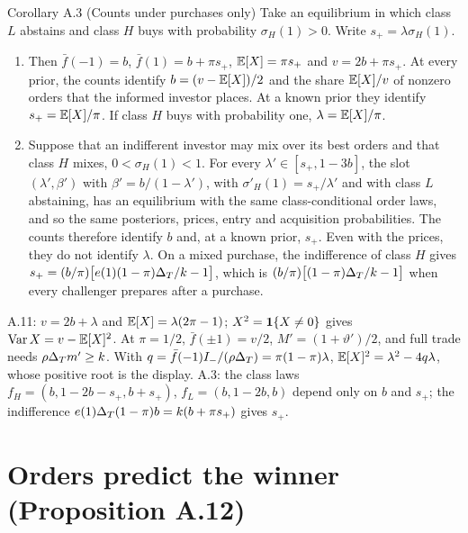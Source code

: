 {\small
\begin{paperresult}{Corollary A.3 (Counts under purchases only)}
Take an equilibrium in which class \(L\) abstains and class \(H\) buys with probability \(\sigma_H(1)>0\). Write \(s_+=\lambda\sigma_H(1)\).
\begin{enumerate}[label=(\alph*),leftmargin=2em,nosep]
\item Then \(\bar f(-1)=b\), \(\bar f(1)=b+\pi s_+\), \(\mathbb{E}[X]=\pi s_+\) and \(v=2b+\pi s_+\). At every prior, the counts identify \(b=(v-\mathbb{E}[X])/2\) and the share \(\mathbb{E}[X]/v\) of nonzero orders that the informed investor places. At a known prior they identify \(s_+=\mathbb{E}[X]/\pi\). If class \(H\) buys with probability one, \(\lambda=\mathbb{E}[X]/\pi\).
\item Suppose that an indifferent investor may mix over its best orders and that class \(H\) mixes, \(0<\sigma_H(1)<1\). For every \(\lambda'\in[s_+,1-3b]\), the slot \((\lambda',\beta')\) with \(\beta'=b/(1-\lambda')\), with \(\sigma'_H(1)=s_+/\lambda'\) and with class \(L\) abstaining, has an equilibrium with the same class-conditional order laws, and so the same posteriors, prices, entry and acquisition probabilities. The counts therefore identify \(b\) and, at a known prior, \(s_+\). Even with the prices, they do not identify \(\lambda\). On a mixed purchase, the indifference of class \(H\) gives \(s_+=(b/\pi)\bigl[e(1)(1-\pi)\Delta_T/k-1\bigr]\), which is \((b/\pi)\bigl[(1-\pi)\Delta_T/k-1\bigr]\) when every challenger prepares after a purchase.
\end{enumerate}
\end{paperresult}}

{\small\begin{derivation}[proof]
A.11: \(v=2b+\lambda\) and \(\mathbb{E}[X]=\lambda(2\pi-1)\); \(X^2=\mathbf{1}\{X\ne0\}\) gives \(\operatorname{Var}X=v-\mathbb{E}[X]^2\). At
\(\pi=1/2\), \(\bar f(\pm1)=v/2\), \(M'=(1+\vartheta')/2\), and full trade needs \(\rho\Delta_T m'\ge k\). With
\(q=\bar f(-1)I_-/(\rho\Delta_T)=\pi(1-\pi)\lambda\), \(\mathbb{E}[X]^2=\lambda^2-4q\lambda\), whose positive root is the display.
A.3: the class laws \(f_H=(b,1-2b-s_+,b+s_+)\), \(f_L=(b,1-2b,b)\) depend only on \(b\) and \(s_+\); the indifference
\(e(1)\Delta_T(1-\pi)b=k(b+\pi s_+)\) gives \(s_+\).
\end{derivation}}

\section{Orders predict the winner (Proposition A.12)}\label{sec:empirical-winner}

